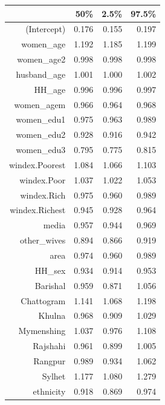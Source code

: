 \begin{table}[ht]
\centering
\begin{tabular}{rrrr}
  \hline
 & 50\% & 2.5\% & 97.5\% \\ 
  \hline
(Intercept) & 0.176 & 0.155 & 0.197 \\ 
  women\_age & 1.192 & 1.185 & 1.199 \\ 
  women\_age2 & 0.998 & 0.998 & 0.998 \\ 
  husband\_age & 1.001 & 1.000 & 1.002 \\ 
  HH\_age & 0.996 & 0.996 & 0.997 \\ 
  women\_agem & 0.966 & 0.964 & 0.968 \\ 
  women\_edu1 & 0.975 & 0.963 & 0.989 \\ 
  women\_edu2 & 0.928 & 0.916 & 0.942 \\ 
  women\_edu3 & 0.795 & 0.775 & 0.815 \\ 
  windex.Poorest & 1.084 & 1.066 & 1.103 \\ 
  windex.Poor & 1.037 & 1.022 & 1.053 \\ 
  windex.Rich & 0.975 & 0.960 & 0.989 \\ 
  windex.Richest & 0.945 & 0.928 & 0.964 \\ 
  media & 0.957 & 0.944 & 0.969 \\ 
  other\_wives & 0.894 & 0.866 & 0.919 \\ 
  area & 0.974 & 0.960 & 0.989 \\ 
  HH\_sex & 0.934 & 0.914 & 0.953 \\ 
  Barishal & 0.959 & 0.871 & 1.056 \\ 
  Chattogram & 1.141 & 1.068 & 1.198 \\ 
  Khulna & 0.968 & 0.909 & 1.029 \\ 
  Mymenshing & 1.037 & 0.976 & 1.108 \\ 
  Rajshahi & 0.961 & 0.899 & 1.005 \\ 
  Rangpur & 0.989 & 0.934 & 1.062 \\ 
  Sylhet & 1.177 & 1.080 & 1.279 \\ 
  ethnicity & 0.918 & 0.869 & 0.974 \\ 
   \hline
\end{tabular}
\end{table}
